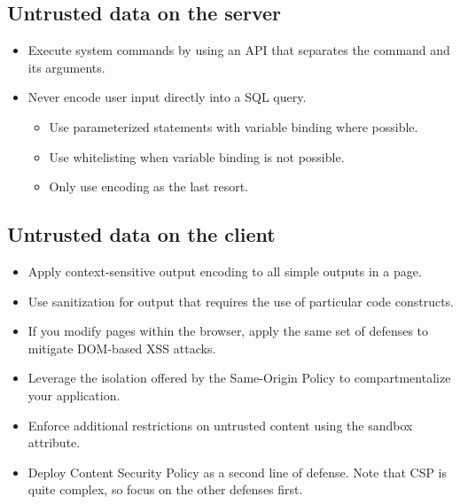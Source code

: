 \documentclass[../main.tex]{subfiles}
\begin{document}
\subsection{Untrusted data on the server}
\begin{itemize}
\item Execute system commands by using an API that separates the command and its arguments.
\item Never encode user input directly into a SQL query.
\begin{itemize}
\item Use parameterized statements with variable binding where possible.
\item Use whitelisting when variable binding is not possible.
\item Only use encoding as the last resort.
\end{itemize}
\end{itemize}

\subsection{Untrusted data on the client}
\begin{itemize}
\item Apply context-sensitive output encoding to all simple outputs in a page.
\item Use sanitization for output that requires the use of particular code constructs.
\item If you modify pages within the browser, apply the same set of defenses to mitigate DOM-based XSS attacks.
\item Leverage the isolation offered by the Same-Origin Policy to compartmentalize your application.
\item Enforce additional restrictions on untrusted content using the sandbox attribute.
\item Deploy Content Security Policy as a second line of defense. Note that CSP is quite complex, so focus on the other defenses first.
\end{itemize}
\end{document}
